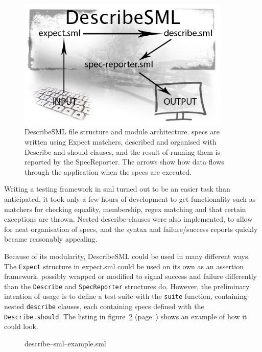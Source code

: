 \documentclass[11pt]{article}
\begin{document}
\begin{figure}[ht!]
\centering
\includegraphics[width=0.9\textwidth]{pics/DescribeSML.png}
\caption{DescribeSML file structure and module architecture. \Glspl{spec} are written using Expect \glspl{matcher}, described and organised with Describe and should clauses, and the result of running them is reported by the SpecReporter. The arrows show how data flows through the application when the \glspl{spec} are executed.}
\label{fig:describesml}
\end{figure}

Writing a testing framework in \gls{sml} turned out to be an easier task than anticipated, it took only a few hours of development to get functionality such as \glspl{matcher} for checking equality, membership, regex matching and that certain exceptions are thrown. Nested describe-clauses were also implemented, to allow for neat organisation of \glspl{spec}, and the syntax and failure/success reports quickly became reasonably appealing.

Because of its modularity, DescribeSML could be used in many different ways. The \texttt{Expect} structure in expect.sml could be used on its own as an assertion framework, possibly wrapped or modified to signal success and failure differently than the \texttt{Describe} and \texttt{SpecReporter} structures do. However, the preliminary intention of usage is to define a test suite with the \texttt{suite} function, containing nested \texttt{describe} clauses, each containing \glspl{spec} defined with the \texttt{Describe.should}. The listing in figure~\ref{lst:describesmlexample} (page~\pageref{lst:describesmlexample}) shows an example of how it could look.

\begin{figure}[ht!]

\caption{describe–sml–example.sml}
\label{lst:describesmlexample}
\end{figure}
\end{document}
